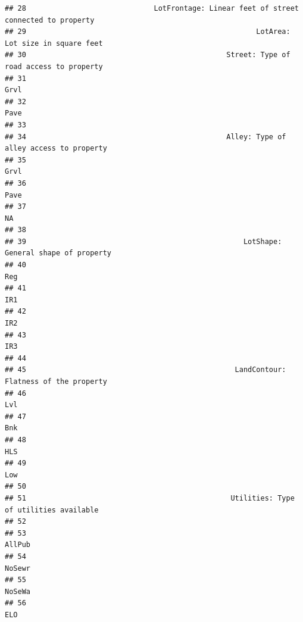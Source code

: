 \documentclass[
]{article}
\begin{document}
\begin{verbatim}
## 28                              LotFrontage: Linear feet of street connected to property
## 29                                                      LotArea: Lot size in square feet
## 30                                               Street: Type of road access to property
## 31                                                                                  Grvl
## 32                                                                                  Pave
## 33                                                                                      
## 34                                               Alley: Type of alley access to property
## 35                                                                                  Grvl
## 36                                                                                  Pave
## 37                                                                                   NA 
## 38                                                                                      
## 39                                                   LotShape: General shape of property
## 40                                                                                   Reg
## 41                                                                                   IR1
## 42                                                                                   IR2
## 43                                                                                   IR3
## 44                                                                                      
## 45                                                 LandContour: Flatness of the property
## 46                                                                                   Lvl
## 47                                                                                   Bnk
## 48                                                                                   HLS
## 49                                                                                   Low
## 50                                                                                      
## 51                                                Utilities: Type of utilities available
## 52                                                                                      
## 53                                                                                AllPub
## 54                                                                                NoSewr
## 55                                                                                NoSeWa
## 56                                                                                   ELO

\end{verbatim}
\end{document}
